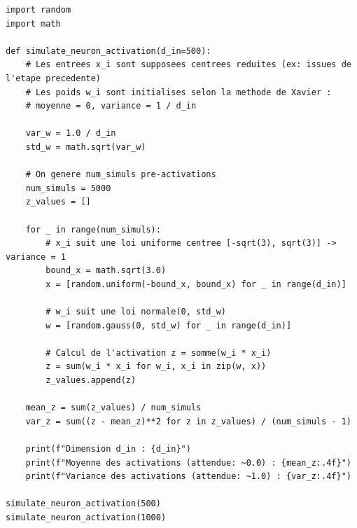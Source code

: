 \documentclass[11pt,a4paper]{article}
\begin{document}
\begin{lstlisting}
import random
import math

def simulate_neuron_activation(d_in=500):
    # Les entrees x_i sont supposees centrees reduites (ex: issues de l'etape precedente)
    # Les poids w_i sont initialises selon la methode de Xavier :
    # moyenne = 0, variance = 1 / d_in

    var_w = 1.0 / d_in
    std_w = math.sqrt(var_w)

    # On genere num_simuls pre-activations
    num_simuls = 5000
    z_values = []

    for _ in range(num_simuls):
        # x_i suit une loi uniforme centree [-sqrt(3), sqrt(3)] -> variance = 1
        bound_x = math.sqrt(3.0)
        x = [random.uniform(-bound_x, bound_x) for _ in range(d_in)]

        # w_i suit une loi normale(0, std_w)
        w = [random.gauss(0, std_w) for _ in range(d_in)]

        # Calcul de l'activation z = somme(w_i * x_i)
        z = sum(w_i * x_i for w_i, x_i in zip(w, x))
        z_values.append(z)

    mean_z = sum(z_values) / num_simuls
    var_z = sum((z - mean_z)**2 for z in z_values) / (num_simuls - 1)

    print(f"Dimension d_in : {d_in}")
    print(f"Moyenne des activations (attendue: ~0.0) : {mean_z:.4f}")
    print(f"Variance des activations (attendue: ~1.0) : {var_z:.4f}")

simulate_neuron_activation(500)
simulate_neuron_activation(1000)
\end{lstlisting}


\vspace{1cm}
\end{document}
